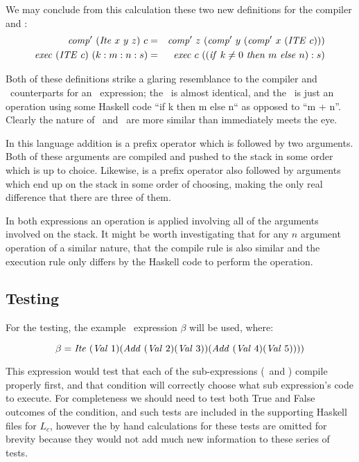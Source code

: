 \documentclass {article}
\begin{document}
We may conclude from this calculation these two new definitions
for the compiler and \vm: 
\begin{eqnarray}
	\Compp  (\Ite x\ y\ z)\ c &=&  \Compp  z\ (\Compp  y\ (\Compp  x\ (\ITE c))) \label{compite}\\
	\Exec (\ITE c)\ (k:m:n:s) &=& \Exec c\ ((\ifff k \not= 0\ \tthen m\ \eelse n):s) \label{execite}
\end{eqnarray}

Both of these definitions strike a glaring resemblance to
the compiler and \vm\ counterparts for an \add\ expression;
the \compp\ is almost identical, and the \exec\ is just an
operation using some Haskell code ``if k then m else n`` as 
opposed to ``m + n''.
Clearly the nature of \add\ and \ite\
are more similar than immediately meets the eye.

In this language
addition is a prefix operator which is followed by two arguments.
Both of these arguments are compiled and pushed to the stack
in some order which is up to choice. Likewise, \ite is a prefix operator also followed by arguments 
which end up on the stack in some order of choosing, 
making the only real difference that there are three of them.

In both expressions an operation is applied involving all 
of the arguments involved on the stack. It might be worth
investigating that for any $n$ argument operation of a similar
nature, that the compile rule is also similar and the 
execution rule only differs by the Haskell 
code to perform the operation.


\subsection{Testing}\label{itetests}

For the testing, the example \ite\ expression $\beta$ will be used, where:

\[\beta = \mathit{Ite\ } (\mathit{Val\ } 1) 
	(\mathit{Add\ } (\mathit{Val\ } 2) (\mathit{Val\ } 3)) (\mathit{Add\ } (\mathit{Val\ } 4) (\mathit{Val\ } 5)))) \]

This expression would test that
each of the sub-expressions 
(\add\ and \val) compile properly first, 
and that condition will correctly  choose what
 sub expression's code to execute.
For completeness we should need to 
test both True and False outcomes of the condition, and
such tests are included in the supporting Haskell files for $L_c$, 
however the by hand calculations for these tests are omitted
for brevity because they would not add much new
information to these series of tests.
\end{document}
